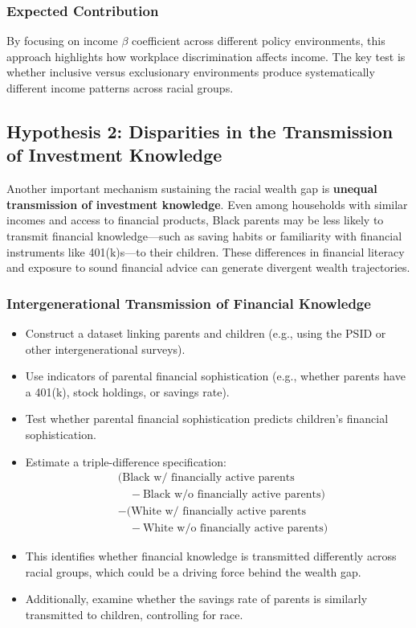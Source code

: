 \documentclass[
  12pt]{article}
\providecommand{\tightlist}{%
  \setlength{\itemsep}{0pt}\setlength{\parskip}{0pt}}\usepackage{longtable,booktabs,array}
\begin{document}
\subsubsection{Expected Contribution}\label{expected-contribution}

By focusing on income \(β\) coefficient across different policy
environments, this approach highlights how workplace discrimination
affects income. The key test is whether inclusive versus exclusionary
environments produce systematically different income patterns across
racial groups.

\subsection{Hypothesis 2: Disparities in the Transmission of Investment
Knowledge}\label{hypothesis-2-disparities-in-the-transmission-of-investment-knowledge}

Another important mechanism sustaining the racial wealth gap is
\textbf{unequal transmission of investment knowledge}. Even among
households with similar incomes and access to financial products, Black
parents may be less likely to transmit financial knowledge---such as
saving habits or familiarity with financial instruments like
401(k)s---to their children. These differences in financial literacy and
exposure to sound financial advice can generate divergent wealth
trajectories.

\subsubsection{Intergenerational Transmission of Financial
Knowledge}\label{intergenerational-transmission-of-financial-knowledge}

\begin{itemize}
\tightlist
\item
  Construct a dataset linking parents and children (e.g., using the PSID
  or other intergenerational surveys).
\item
  Use indicators of parental financial sophistication (e.g., whether
  parents have a 401(k), stock holdings, or savings rate).
\item
  Test whether parental financial sophistication predicts children's
  financial sophistication.
\item
  Estimate a triple-difference specification: \begin{align*}
    & \Big( \text{Black w/ financially active parents} \\
    & \quad - \text{Black w/o financially active parents} \Big) \\
    & - \Big( \text{White w/ financially active parents} \\
    & \quad - \text{White w/o financially active parents} \Big)
  \end{align*}
\item
  This identifies whether financial knowledge is transmitted differently
  across racial groups, which could be a driving force behind the wealth
  gap.
\item
  Additionally, examine whether the savings rate of parents is similarly
  transmitted to children, controlling for race.
\end{itemize}
\end{document}
